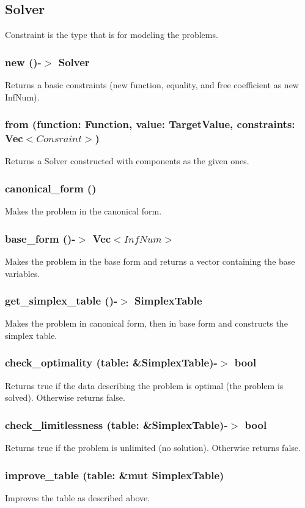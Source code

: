\documentclass[]{article}
\begin{document}
			\subsection{Solver}
				\Large{Constraint is the type that is for modeling the problems.}
				\subsubsection{new ()-$>$ Solver}
					Returns a basic constraints (new function, equality, and free coefficient as new InfNum).
				\subsubsection{from (function: Function, value: TargetValue, constraints: Vec$<Consraint>$)}
					Returns a Solver constructed with components as the given ones.
				\subsubsection{canonical\_form ()}
					Makes the problem in the canonical form.
				\subsubsection{base\_form ()-$>$ Vec$<InfNum>$}
					Makes the problem in the base form and returns a vector containing the base variables.
				\subsubsection{get\_simplex\_table ()-$>$ SimplexTable}
					Makes the problem in canonical form, then in base form and constructs the simplex table.
				\subsubsection{check\_optimality (table: \&SimplexTable)-$>$ bool}
					Returns true if the data describing the problem is optimal (the problem is solved). Otherwise returns false.
				\subsubsection{check\_limitlessness (table: \&SimplexTable)-$>$ bool}
					Returns true if the problem is unlimited (no solution). Otherwise returns false.
				\subsubsection{improve\_table (table: \&mut SimplexTable)}
					Improves the table as described above.
	\newpage
\end{document}
